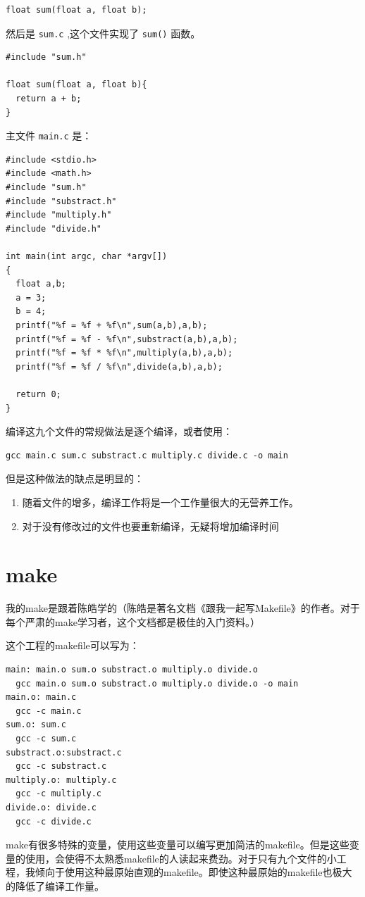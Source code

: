\documentclass[10pt,a4paper,UTF8]{article}
\begin{document}
\lstset{language=C,label= ,caption= ,captionpos=b,numbers=none}
\begin{lstlisting}
float sum(float a, float b);
\end{lstlisting}
然后是 \texttt{sum.c} ,这个文件实现了 \texttt{sum()} 函数。
\lstset{language=C,label= ,caption= ,captionpos=b,numbers=none}
\begin{lstlisting}
#include "sum.h"

float sum(float a, float b){
  return a + b;
}
\end{lstlisting}
主文件 \texttt{main.c} 是：
\lstset{language=C,label= ,caption= ,captionpos=b,numbers=none}
\begin{lstlisting}
#include <stdio.h>
#include <math.h>
#include "sum.h"
#include "substract.h"
#include "multiply.h"
#include "divide.h"

int main(int argc, char *argv[])
{
  float a,b;
  a = 3;
  b = 4;
  printf("%f = %f + %f\n",sum(a,b),a,b);
  printf("%f = %f - %f\n",substract(a,b),a,b);
  printf("%f = %f * %f\n",multiply(a,b),a,b);
  printf("%f = %f / %f\n",divide(a,b),a,b);

  return 0;
}
\end{lstlisting}
编译这九个文件的常规做法是逐个编译，或者使用：
\begin{verbatim}
gcc main.c sum.c substract.c multiply.c divide.c -o main
\end{verbatim}
但是这种做法的缺点是明显的：
\begin{enumerate}
\item 随着文件的增多，编译工作将是一个工作量很大的无营养工作。
\item 对于没有修改过的文件也要重新编译，无疑将增加编译时间
\end{enumerate}
\section{make}
\label{sec:orgea4c38d}


我的make是跟着陈皓学的（陈皓是著名文档《跟我一起写Makefile》的作者。对于每个严肃的make学习者，这个文档都是极佳的入门资料。）

这个工程的makefile可以写为：
\lstset{language=make,label= ,caption= ,captionpos=b,numbers=none}
\begin{lstlisting}
main: main.o sum.o substract.o multiply.o divide.o
  gcc main.o sum.o substract.o multiply.o divide.o -o main
main.o: main.c
  gcc -c main.c
sum.o: sum.c
  gcc -c sum.c
substract.o:substract.c
  gcc -c substract.c
multiply.o: multiply.c
  gcc -c multiply.c
divide.o: divide.c
  gcc -c divide.c
\end{lstlisting}
make有很多特殊的变量，使用这些变量可以编写更加简洁的makefile。但是这些变量的使用，会使得不太熟悉makefile的人读起来费劲。对于只有九个文件的小工程，我倾向于使用这种最原始直观的makefile。即使这种最原始的makefile也极大的降低了编译工作量。
\end{document}
